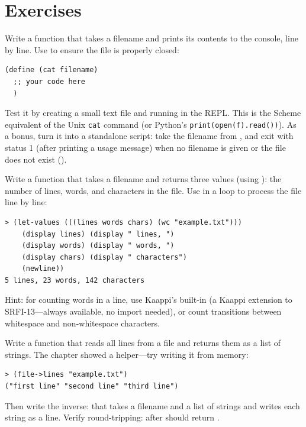 \section*{Exercises}

\begin{exercise}
Write a function  that takes a filename and prints its contents to the console, line by line. Use  to ensure the file is properly closed:

\begin{lstlisting}
(define (cat filename)
  ;; your code here
  )
\end{lstlisting}

Test it by creating a small text file and running  in the REPL. This is the Scheme equivalent of the Unix \texttt{cat} command (or Python's \texttt{print(open(f).read())}). As a bonus, turn it into a standalone script: take the filename from , and exit with status 1 (after printing a usage message) when no filename is given or the file does not exist ().
\end{exercise}

\begin{exercise}
Write a function  that takes a filename and returns three values (using ): the number of lines, words, and characters in the file. Use  in a loop to process the file line by line:

\begin{lstlisting}[style=repl]
> (let-values (((lines words chars) (wc "example.txt")))
    (display lines) (display " lines, ")
    (display words) (display " words, ")
    (display chars) (display " characters")
    (newline))
5 lines, 23 words, 142 characters
\end{lstlisting}

Hint: for counting words in a line, use Kaappi's built-in  (a Kaappi extension to SRFI-13---always available, no import needed), or count transitions between whitespace and non-whitespace characters.
\end{exercise}

\begin{exercise}
Write a function  that reads all lines from a file and returns them as a list of strings. The chapter showed a  helper---try writing it from memory:

\begin{lstlisting}[style=repl]
> (file->lines "example.txt")
("first line" "second line" "third line")
\end{lstlisting}

Then write the inverse:  that takes a filename and a list of strings and writes each string as a line. Verify round-tripping:  after  should return .
\end{exercise}

